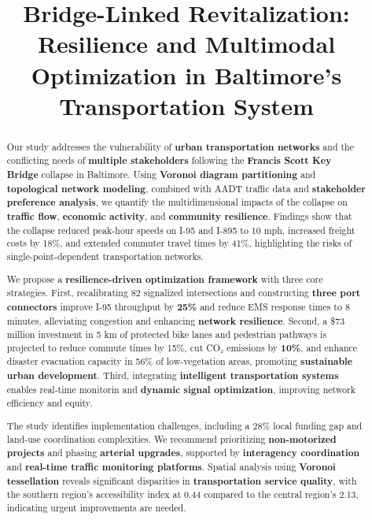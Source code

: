 \documentclass{mcmthesis}
\title{Bridge-Linked Revitalization: Resilience and Multimodal Optimization in Baltimore's Transportation System}
\begin{document}
\setcounter{page}{1}   %
\thispagestyle{empty}  %

\begin{abstract}
  
 \par
  

Our study addresses the vulnerability of \textbf{urban transportation networks} and the conflicting needs of \textbf{multiple stakeholders} following the \textbf{Francis Scott Key Bridge} collapse in Baltimore. Using \textbf{Voronoi diagram partitioning} and \textbf{topological network modeling}, combined with AADT traffic data and \textbf{stakeholder preference analysis}, we quantify the multidimensional impacts of the collapse on \textbf{traffic flow}, \textbf{economic activity}, and \textbf{community resilience}. Findings show that the collapse reduced peak-hour speeds on I-95 and I-895 to 10 mph, increased freight costs by 18\%, and extended commuter travel times by 41\%, highlighting the risks of single-point-dependent transportation networks.

We propose a \textbf{resilience-driven optimization framework} with three core strategies. First, recalibrating 82 signalized intersections and constructing \textbf{three port connectors} improve I-95 throughput by \textbf{25\%} and reduce EMS response times to 8 minutes, alleviating congestion and enhancing \textbf{network resilience}. Second, a \$73 million investment in 5 km of protected bike lanes and pedestrian pathways is projected to reduce commute times by 15\%, cut CO₂ emissions by \textbf{10\%}, and enhance disaster evacuation capacity in 56\% of low-vegetation areas, promoting \textbf{sustainable urban development}. Third, integrating \textbf{intelligent transportation systems} enables real-time monitorin and \textbf{dynamic signal optimization}, improving network efficiency and equity.

The study identifies implementation challenges, including a 28\% local funding gap and land-use coordination complexities. We recommend prioritizing \textbf{non-motorized projects} and phasing \textbf{arterial upgrades}, supported by \textbf{interagency coordination} and \textbf{real-time traffic monitoring platforms}. Spatial analysis using \textbf{Voronoi tessellation} reveals significant disparities in \textbf{transportation service quality}, with the southern region’s accessibility index at 0.44 compared to the central region’s 2.13, indicating urgent improvements are needed.


\end{abstract}
\end{document}
